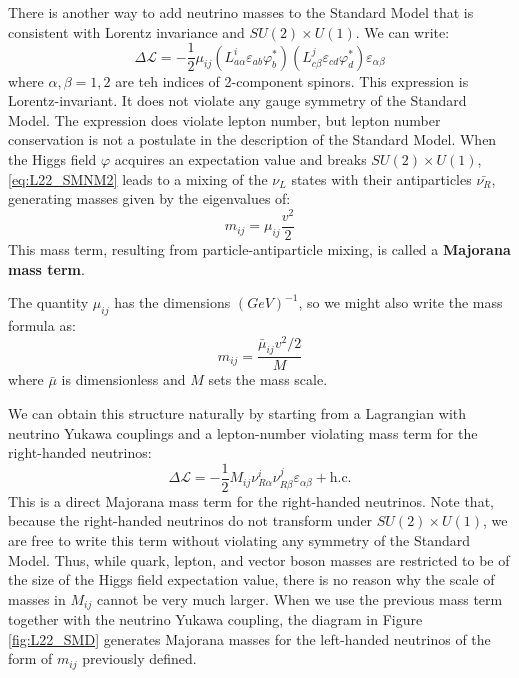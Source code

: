 \documentclass[../../main/main.tex]{subfiles}
\begin{document}
There is another way to add neutrino masses to the Standard Model that is consistent with Lorentz invariance and \( SU(2) \times U(1) \). We can write:
\begin{equation}
	\Delta \mathcal{L}
	=
	- \frac{1}{2} \mu_{ij}
	(L^{i}_{a \alpha} \varepsilon_{ab} \varphi^{*}_{b})
	(L^{j}_{c \beta}  \varepsilon_{cd} \varphi^{*}_{d})
	\varepsilon_{\alpha \beta}
	\label{eq:L22_SMNM2}
\end{equation}
where \( \alpha, \beta = 1,2 \) are teh indices of 2-component spinors. This expression is Lorentz-invariant. It does not violate any gauge symmetry of the Standard Model. The expression does violate lepton number, but lepton number conservation is not a postulate in the description of the Standard Model.
When the Higgs field \( \varphi \) acquires an expectation value and breaks \( SU(2) \times U(1) \), \ref{eq:L22_SMNM2} leads to a mixing of the \( \nu_L \) states with their antiparticles \( \bar{\nu_R} \), generating masses given by the eigenvalues of:
\begin{equation}
	m_{ij}
	=
	\mu_{ij} \frac{v^2}{2}
	\label{eq:}
\end{equation}
This mass term, resulting from particle-antiparticle mixing, is called a \textbf{Majorana mass term}.

The quantity \( \mu_{ij} \) has the dimensions \( (\si{GeV})^{-1} \), so we might also write the mass formula as:
\begin{equation}
	m_{ij}
	=
	\frac{\bar{\mu}_{ij} v^2 / 2}{M}
	\label{eq:}
\end{equation}
where \( \bar{\mu} \) is dimensionless and \( M \) sets the mass scale.

We can obtain this structure naturally by starting from a Lagrangian with neutrino Yukawa couplings and a lepton-number violating mass term for the right-handed neutrinos:
\begin{equation}
	\Delta \mathcal{L}
	=
	- \frac{1}{2} M_{ij} \nu^{i}_{R\alpha} \nu^{j}_{R\beta} \varepsilon_{\alpha\beta}
	+ \text{h.c.}
	\label{eq:}
\end{equation}
This is a direct Majorana mass term for the right-handed neutrinos. Note that, because the right-handed neutrinos do not transform under \( SU(2) \times U(1) \), we are free to write this term without violating any symmetry of the Standard Model. Thus, while quark, lepton, and vector boson masses are restricted to be of the size of the Higgs field expectation value, there is no reason why the scale of masses in \( M_{ij} \) cannot be very much larger. When we use the previous mass term together with the neutrino Yukawa coupling, the diagram in Figure \ref{fig:L22_SMD} generates Majorana masses for the left-handed neutrinos of the form of \( m_{ij} \) previously defined.
\end{document}
